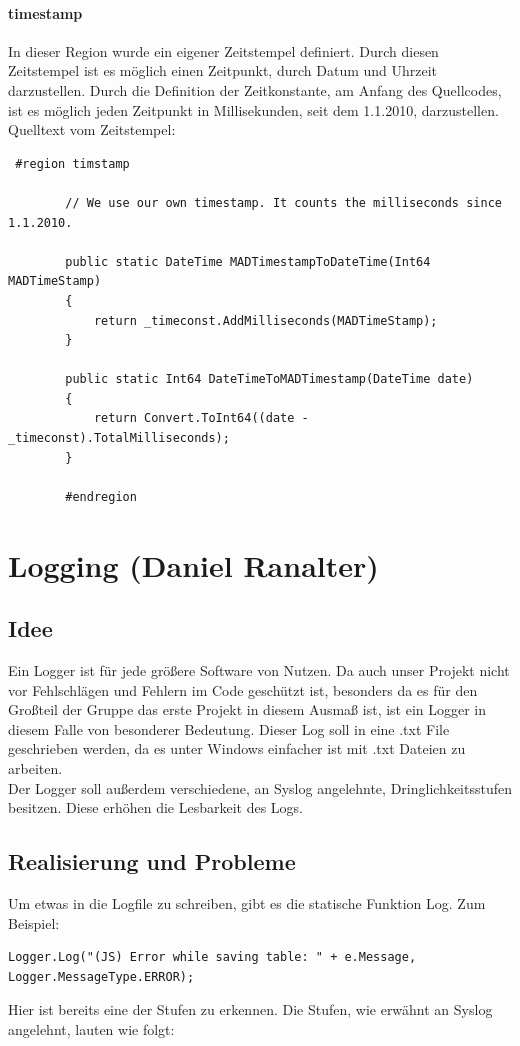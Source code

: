 \documentclass[12pt,a4paper]{report}
\begin{document}
\begin{onehalfspace}
\subsubsection{timestamp}
In dieser Region wurde ein eigener Zeitstempel definiert.
Durch diesen Zeitstempel ist es möglich einen Zeitpunkt, durch Datum und Uhrzeit darzustellen. Durch die Definition der Zeitkonstante, am Anfang des Quellcodes, ist es möglich jeden Zeitpunkt in Millisekunden, seit dem 1.1.2010, darzustellen.
Quelltext vom Zeitstempel:
\begin{lstlisting}
 #region timstamp

        // We use our own timestamp. It counts the milliseconds since 1.1.2010.

        public static DateTime MADTimestampToDateTime(Int64 MADTimeStamp)
        {
            return _timeconst.AddMilliseconds(MADTimeStamp);
        }

        public static Int64 DateTimeToMADTimestamp(DateTime date)
        {
            return Convert.ToInt64((date - _timeconst).TotalMilliseconds);
        }

        #endregion
\end{lstlisting}

\chapter{Logging (Daniel Ranalter)}
\section{Idee}
Ein Logger ist für jede größere Software von Nutzen. Da auch unser Projekt nicht vor Fehlschlägen und Fehlern im Code geschützt ist, besonders da es für den Großteil der Gruppe das erste Projekt in diesem Ausmaß ist, ist ein Logger in diesem Falle von besonderer Bedeutung. Dieser Log soll in eine .txt File geschrieben werden, da es unter Windows einfacher ist mit .txt Dateien zu arbeiten.\\
Der Logger soll außerdem verschiedene, an Syslog angelehnte, Dringlichkeitsstufen besitzen. Diese erhöhen die Lesbarkeit des Logs.

\section{Realisierung und Probleme}
Um etwas in die Logfile zu schreiben, gibt es die statische Funktion Log. Zum Beispiel:
\begin{lstlisting}
Logger.Log("(JS) Error while saving table: " + e.Message, Logger.MessageType.ERROR);
\end{lstlisting}
Hier ist bereits eine der Stufen zu erkennen. Die Stufen, wie erwähnt an Syslog angelehnt, lauten wie folgt:


\end{onehalfspace}
\end{document}
